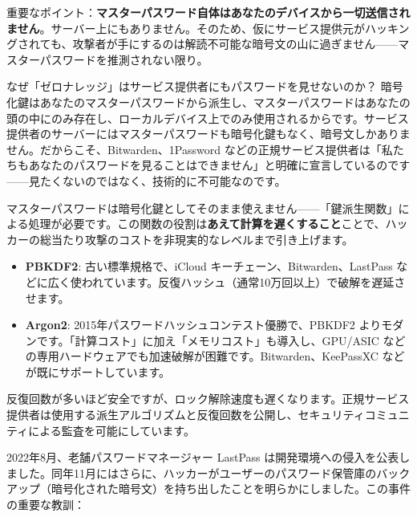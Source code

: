 重要なポイント：\textbf{マスターパスワード自体はあなたのデバイスから一切送信されません}。サーバー上にもありません。そのため、仮にサービス提供元がハッキングされても、攻撃者が手にするのは解読不可能な暗号文の山に過ぎません——マスターパスワードを推測されない限り。

\begin{tcbinfo}{なぜ「ゼロナレッジ」はサービス提供者にもパスワードを見せないのか？}
暗号化鍵はあなたのマスターパスワードから派生し、マスターパスワードはあなたの頭の中にのみ存在し、ローカルデバイス上でのみ使用されるからです。サービス提供者のサーバーにはマスターパスワードも暗号化鍵もなく、暗号文しかありません。だからこそ、Bitwarden、1Password などの正規サービス提供者は「私たちもあなたのパスワードを見ることはできません」と明確に宣言しているのです——見たくないのではなく、技術的に不可能なのです。

\end{tcbinfo}


マスターパスワードは暗号化鍵としてそのまま使えません——「鍵派生関数」による処理が必要です。この関数の役割は\textbf{あえて計算を遅くすること}ことで、ハッカーの総当たり攻撃のコストを非現実的なレベルまで引き上げます。

\begin{itemize}
  \item \textbf{PBKDF2}: 古い標準規格で、iCloud キーチェーン、Bitwarden、LastPass などに広く使われています。反復ハッシュ（通常10万回以上）で破解を遅延させます。
  \item \textbf{Argon2}: 2015年パスワードハッシュコンテスト優勝で、PBKDF2 よりモダンです。「計算コスト」に加え「メモリコスト」も導入し、GPU/ASIC などの専用ハードウェアでも加速破解が困難です。Bitwarden、KeePassXC などが既にサポートしています。
\end{itemize}

反復回数が多いほど安全ですが、ロック解除速度も遅くなります。正規サービス提供者は使用する派生アルゴリズムと反復回数を公開し、セキュリティコミュニティによる監査を可能にしています。


2022年8月、老舗パスワードマネージャー LastPass は開発環境への侵入を公表しました。同年11月にはさらに、ハッカーがユーザーのパスワード保管庫のバックアップ（暗号化された暗号文）を持ち出したことを明らかにしました。この事件の重要な教訓：

